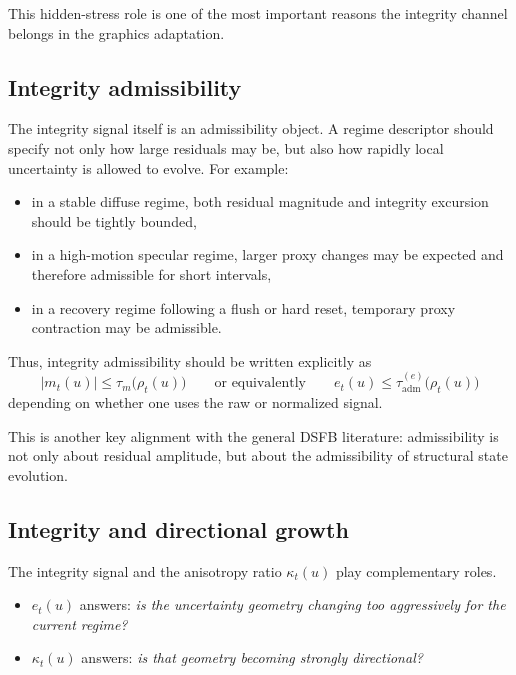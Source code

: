 \documentclass[11pt]{article}
\theoremstyle{definition}
\theoremstyle{plain}
\begin{document}
This hidden-stress role is one of the most important reasons the integrity channel belongs in the graphics adaptation.


\subsection{Integrity admissibility}

The integrity signal itself is an admissibility object. A regime descriptor should specify not only how large residuals may be, but also how rapidly local uncertainty is allowed to evolve. For example:
\begin{itemize}[leftmargin=1.5em]
    \item in a stable diffuse regime, both residual magnitude and integrity excursion should be tightly bounded,
    \item in a high-motion specular regime, larger proxy changes may be expected and therefore admissible for short intervals,
    \item in a recovery regime following a flush or hard reset, temporary proxy contraction may be admissible.
\end{itemize}

Thus, integrity admissibility should be written explicitly as
\begin{equation}
|m_t(u)|\le \tau_m\bigl(\rho_t(u)\bigr)
\qquad \text{or equivalently} \qquad
e_t(u)\le \tau^{(e)}_{\mathrm{adm}}\bigl(\rho_t(u)\bigr)
\end{equation}
depending on whether one uses the raw or normalized signal.

This is another key alignment with the general DSFB literature: admissibility is not only about residual amplitude, but about the admissibility of structural state evolution. 


\subsection{Integrity and directional growth}

The integrity signal and the anisotropy ratio $\kappa_t(u)$ play complementary roles.

\begin{itemize}[leftmargin=1.5em]
    \item $e_t(u)$ answers: \emph{is the uncertainty geometry changing too aggressively for the current regime?}
    \item $\kappa_t(u)$ answers: \emph{is that geometry becoming strongly directional?}
\end{itemize}
\end{document}
